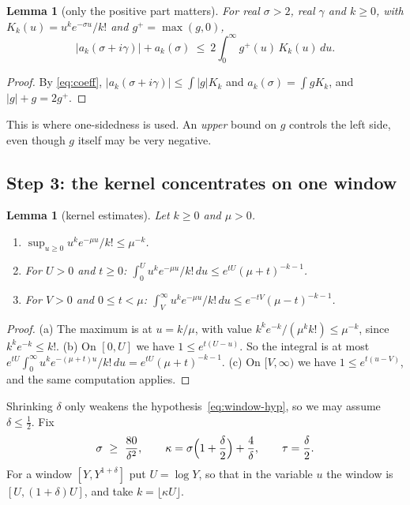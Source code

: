 \documentclass[11pt]{amsart}
\newtheorem{lemma}[theorem]{Lemma}
\theoremstyle{definition}
\theoremstyle{remark}
\begin{document}
\begin{lemma}[only the positive part matters]\label{lem:pospart}
For real $\sigma>2$, real $\gamma$ and $k\ge0$, with $K_k(u)=u^ke^{-\sigma u}/k!$ and $g^+=\max(g,0)$,
\[
|a_k(\sigma+i\gamma)|+a_k(\sigma)\ \le\ 2\int_0^\infty g^+(u)\,K_k(u)\,du .
\]
\end{lemma}

\begin{proof}
By \eqref{eq:coeff}, $|a_k(\sigma+i\gamma)|\le\int|g|K_k$ and $a_k(\sigma)=\int gK_k$, and $|g|+g=2g^+$.
\end{proof}

This is where one-sidedness is used. An \emph{upper} bound on $g$ controls the left side, even though $g$ itself may be very negative.

\subsection{Step 3: the kernel concentrates on one window}
\begin{lemma}[kernel estimates]\label{lem:kernel}
Let $k\ge0$ and $\mu>0$.
\begin{enumerate}[label=(\alph*)]
\item $\sup_{u\ge0}u^ke^{-\mu u}/k!\le\mu^{-k}$.
\item For $U>0$ and $t\ge0$: $\int_0^U u^ke^{-\mu u}/k!\,du\le e^{tU}(\mu+t)^{-k-1}$.
\item For $V>0$ and $0\le t<\mu$: $\int_V^\infty u^ke^{-\mu u}/k!\,du\le e^{-tV}(\mu-t)^{-k-1}$.
\end{enumerate}
\end{lemma}

\begin{proof}
(a) The maximum is at $u=k/\mu$, with value $k^ke^{-k}/(\mu^kk!)\le\mu^{-k}$, since $k^ke^{-k}\le k!$.
(b) On $[0,U]$ we have $1\le e^{t(U-u)}$. So the integral is at most $e^{tU}\int_0^\infty u^ke^{-(\mu+t)u}/k!\,du=e^{tU}(\mu+t)^{-k-1}$.
(c) On $[V,\infty)$ we have $1\le e^{t(u-V)}$, and the same computation applies.
\end{proof}

Shrinking $\delta$ only weakens the hypothesis~\eqref{eq:window-hyp}, so we may assume $\delta\le\tfrac12$. Fix
\[
\sigma\ \ge\ \frac{80}{\delta^2},\qquad
\kappa=\sigma\Bigl(1+\frac\delta2\Bigr)+\frac4\delta,\qquad
\tau=\frac\delta2 .
\]
For a window $[Y,Y^{1+\delta}]$ put $U=\log Y$, so that in the variable $u$ the window is $[U,(1+\delta)U]$, and take $k=\lfloor\kappa U\rfloor$.
\end{document}
